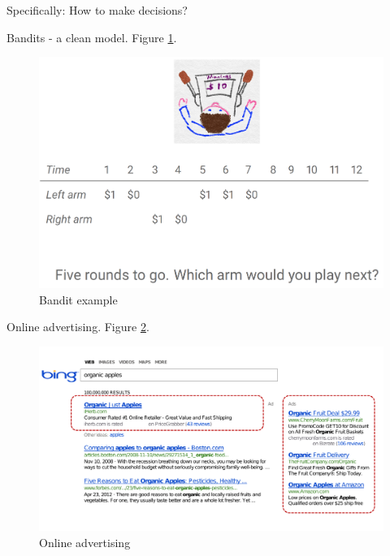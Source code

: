 \documentclass[english]{article}
\begin{document}
\item Specifically: How to make decisions?

\eitem




\item {Bandits - a clean model}. Figure \ref{band_ex}.
\begin{figure}[h!]
\begin{center}
\includegraphics[width=0.4\paperwidth]{bandits}
    \caption{Bandit example}
    \label{band_ex}
\end{center}
\end{figure}



\item {Online advertising}. Figure \ref{online_ad}.
\begin{figure}[h!]
\begin{center}
\includegraphics[width=0.5\paperwidth]{online_ad}
    \caption{Online advertising}
    \label{online_ad}
\end{center}
\end{figure}
\end{document}
